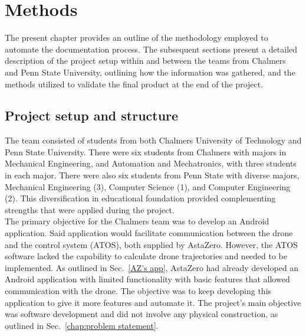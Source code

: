 
\chapter{Methods}
The present chapter provides an outline of the methodology employed to automate the documentation process. The subsequent sections present a detailed description of the project setup within and between the teams from Chalmers and Penn State University, outlining how the information was gathered, and the methods utilized to validate the final product at the end of the project.

\section{Project setup and structure}
The team consisted of students from both Chalmers University of Technology
and Penn State University. There were six students from Chalmers with majors in Mechanical Engineering, and Automation and Mechatronics, with three students in each major. There were also six students from Penn State with diverse majors, Mechanical Engineering (3), Computer Science (1), and Computer Engineering (2). This diversification in educational foundation provided complementing strengths that were applied during the project.
\\

The primary objective for the Chalmers team was to develop an Android application. Said application would facilitate communication between the drone and the control system (ATOS), both supplied by AstaZero. However, the ATOS software lacked the capability to calculate drone trajectories and needed to be implemented. As outlined in Sec.~\ref{AZ's app}, AstaZero had already developed an Android application with limited functionality with basic features that allowed communication with the drone. The objective was to keep developing this application to give it more features and automate it. The project's main objective was software development and did not involve any physical construction, as outlined in Sec.~\ref{chap:problem statement}.


